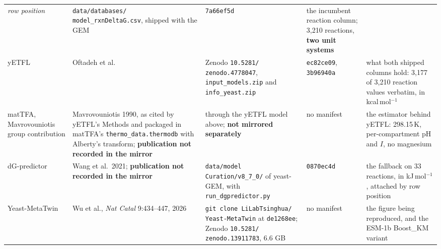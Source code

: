 \begin{table}[!htbp]
\begin{tabular}{@{}p{}p{}p{}p{}p{}@{}}
      \emph{row position} & \texttt{data/databases/} \texttt{model\_rxnDeltaG.csv},
      shipped with the GEM & \texttt{7a66ef5d} &
      the incumbent reaction column; 3{,}210 reactions, \textbf{two unit systems} \\
    yETFL & Oftadeh et al.~\cite{oftadehGenomescaleMetabolicModel2021} &
      Zenodo \texttt{10.5281/} \texttt{zenodo.4778047}, \texttt{input\_models.zip} and
      \texttt{info\_yeast.zip} & \texttt{ec82ce09}, \texttt{3b96940a} &
      what both shipped columns hold: 3{,}177 of 3{,}210 reaction values verbatim, in
      kcal\,mol$^{-1}$ \\
    matTFA, Mavrovouniotis group contribution & Mavrovouniotis 1990, as cited by yETFL's
      Methods and packaged in matTFA's \texttt{thermo\_data.thermodb} with Alberty's
      transform; \textbf{publication not recorded in the mirror} &
      through the yETFL model above; \textbf{not mirrored separately} &
      no manifest &
      the estimator behind yETFL: 298.15\,K, per-compartment pH and $I$, no magnesium \\
    dG-predictor & Wang et al.\ 2021; \textbf{publication not recorded in the mirror} &
      \texttt{data/model} \texttt{Curation/v8\_7\_0/} of yeast-GEM, with
      \texttt{run\_dgpredictor.py} & \texttt{0870ec4d} &
      the fallback on 33 reactions, in kJ\,mol$^{-1}$, attached by row position \\
    Yeast-MetaTwin~\cite{wuSystematicallyExploringYeast2026} & Wu et al., \emph{Nat Catal}
      9:434--447, 2026 &
      \texttt{git clone LiLabTsinghua/} \texttt{Yeast-MetaTwin} at \texttt{de1268ee};
      Zenodo \texttt{10.5281/} \texttt{zenodo.13911783}, 6.6 GB &
      no manifest & the figure being reproduced, and the ESM-1b Boost\_KM variant \\
    \hline
  \end{tabular}
\end{table}

